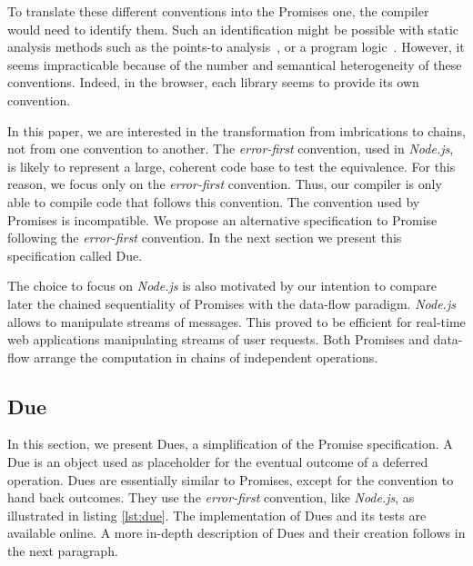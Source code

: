 To translate these different conventions into the Promises one, the compiler would need to identify them.
Such an identification might be possible with static analysis methods such as the points-to analysis~\cite{Wei2014}, or a program logic~\cite{Gardner2013,Bodin2014}.
However, it seems impracticable because of the number and semantical heterogeneity of these conventions.
Indeed, in the browser, each library seems to provide its own convention.

In this paper, we are interested in the transformation from imbrications to chains, not from one convention to another.
The \textit{error-first} convention, used in \textit{Node.js}, is likely to represent a large, coherent code base to test the equivalence.
For this reason, we focus only on the \textit{error-first} convention.
Thus, our compiler is only able to compile code that follows this convention.
The convention used by Promises is incompatible.
We propose an alternative specification to Promise following the \textit{error-first} convention.
In the next section we present this specification called Due.

The choice to focus on \textit{Node.js} is also motivated by our intention to compare later the chained sequentiality of Promises with the data-flow paradigm.
\textit{Node.js} allows to manipulate streams of messages.
This proved to be efficient for real-time web applications manipulating streams of user requests.
Both Promises and data-flow arrange the computation in chains of independent operations.

\subsection{Due} \label{section:definitions:due}

In this section, we present Dues, a simplification of the Promise specification.
A Due is an object used as placeholder for the eventual outcome of a deferred operation.
Dues are essentially similar to Promises, except for the convention to hand back outcomes.
They use the \textit{error-first} convention, like \textit{Node.js}, as illustrated in listing \ref{lst:due}.
The implementation of Dues and its tests are available online.
A more in-depth description of Dues and their creation follows in the next paragraph.

